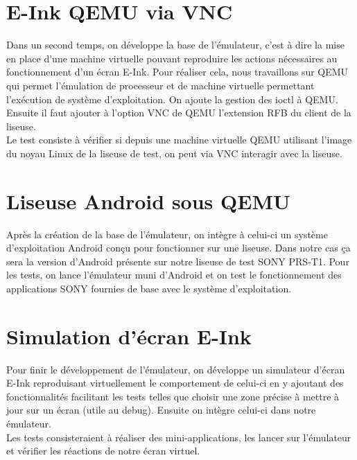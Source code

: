 \newpage

\section{E-Ink QEMU via VNC}

Dans un second temps, on développe la base de l'émulateur, c'est à dire la mise en place d'une machine virtuelle pouvant reproduire les actions nécessaires au fonctionnement d'un écran E-Ink. Pour réaliser cela, nous travaillons sur QEMU qui permet l'émulation de processeur et de machine virtuelle permettant l'exécution de système d'exploitation. On ajoute la gestion des ioctl à QEMU. Ensuite il faut ajouter à l'option VNC de QEMU l'extension RFB du client de la liseuse.
\\Le test consiste à vérifier si depuis une machine virtuelle QEMU utilisant l'image du noyau Linux de la liseuse de test, on peut via VNC interagir avec la liseuse. 


\section{Liseuse Android sous QEMU}

Après la création de la base de l'émulateur, on intègre à celui-ci un système d'exploitation Android conçu pour fonctionner sur une liseuse. Dans notre cas ça sera la version d'Android présente sur notre liseuse de test SONY PRS-T1.
Pour les tests, on lance l'émulateur muni d'Android et on test le fonctionnement des applications SONY fournies de base avec le système d'exploitation.

\section{Simulation d'écran E-Ink}

Pour finir le développement de l'émulateur, on développe un simulateur d'écran E-Ink reproduisant virtuellement le comportement de celui-ci en y ajoutant des fonctionnalités facilitant les tests telles que choisir une zone précise à mettre à jour sur un écran (utile au debug). Ensuite on intègre celui-ci dans notre émulateur.
\\Les tests consisteraient à réaliser des mini-applications, les lancer sur l'émulateur et vérifier les réactions de notre écran virtuel.

